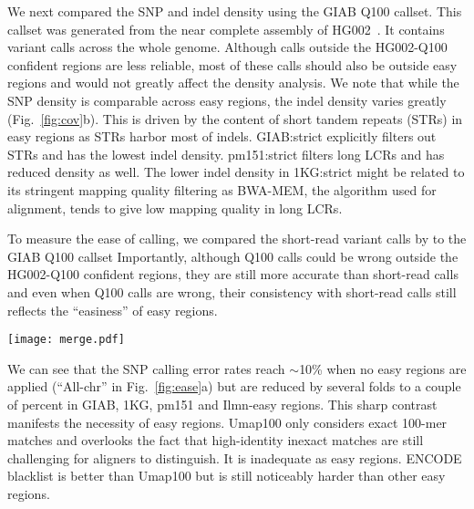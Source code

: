 \documentclass[webpdf,contemporary,large,namedate]{oup-authoring-template}%
\begin{document}
We next compared the SNP and indel density using the GIAB Q100 callset.
This callset was generated from the near complete assembly of HG002~\citep{Rautiainen:2023ab}.
It contains variant calls across the whole genome.
Although calls outside the HG002-Q100 confident regions are less reliable,
most of these calls should also be outside easy regions and would not greatly affect the density analysis.
We note that while the SNP density is comparable across easy regions,
the indel density varies greatly (Fig.~\ref{fig:cov}b).
This is driven by the content of short tandem repeats (STRs) in easy regions as STRs harbor most of indels.
GIAB:strict explicitly filters out STRs and has the lowest indel density.
pm151:strict filters long LCRs and has reduced density as well.
The lower indel density in 1KG:strict might be related to its stringent mapping quality filtering
as BWA-MEM, the algorithm used for alignment, tends to give low mapping quality in long LCRs.

To measure the ease of calling, we compared the short-read variant calls by \citet{Baid2020.12.11.422022} to the GIAB Q100 callset
Importantly, although Q100 calls could be wrong outside the HG002-Q100 confident regions,
they are still more accurate than short-read calls
and even when Q100 calls are wrong, their consistency with short-read calls
still reflects the ``easiness'' of easy regions.

\begin{figure*}[tb]
\texttt{[image: merge.pdf]}
\caption{Small variant calling accuracy in easy and confident regions.
{\bf (a)} SNP accuracy.
DeepVariant, Strelka2, Octopus and GATK short-read variant calls from 30X NovaSeq data were obtained from \citet{Baid2020.12.11.422022}.
Pipelup calls were made with ``{\tt minipileup -ys3 -a1 -p.25}''.
False discovery rate (FDR) and false negative rate (FNR) were calculated by RTG vcfeval~\citep{Cleary023754}
with genotype errors ignored.
``All-chr'' represents all chromosomal sequences in GRCh38 without easy regions.
{\bf (b)} SNP accuracy in high-quality easy regions.
{\bf (c)} Indel accuracy in high-quality easy regions.
Pileup indel calls are omitted due to their high error rates.
}\label{fig:ease}
\end{figure*}

We can see that the SNP calling error rates reach $\sim$10\% when no easy regions are applied (``All-chr'' in Fig.~\ref{fig:ease}a)
but are reduced by several folds to a couple of percent in GIAB, 1KG, pm151 and Ilmn-easy regions.
This sharp contrast manifests the necessity of easy regions.
Umap100 only considers exact 100-mer matches and overlooks the fact that high-identity inexact matches
are still challenging for aligners to distinguish.
It is inadequate as easy regions.
ENCODE blacklist is better than Umap100 but is still noticeably harder than other easy regions.
\end{document}
